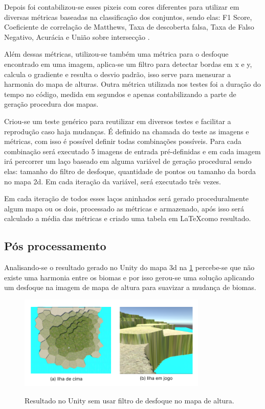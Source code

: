 Depois foi contabilizou-se esses pixeis com cores diferentes para utilizar em diversas métricas baseadas na classificação dos conjuntos, sendo elas: F1 Score, Coeficiente de correlação de Matthews, Taxa de descoberta falsa, Taxa de Falso Negativo, Acurácia e União sobre intersecção \cite{Chicco2020, confusion_matrix_calculator, iou_metric_link}.


Além dessas métricas, utilizou-se também uma métrica para o desfoque encontrado em uma imagem, aplica-se um filtro para detectar bordas em x e y, calcula o gradiente e resulta o desvio padrão, isso serve para mensurar a harmonia do mapa de alturas. Outra métrica utilizada nos testes foi a duração do tempo no código, medida em segundos e apenas contabilizando a parte de geração procedura dos mapas.

Criou-se um teste genérico para reutilizar em diversos testes e facilitar a reprodução caso haja mudanças. É definido na chamada do teste as imagens e métricas, com isso é possível definir todas combinações possíveis. Para cada combinação será executado 5 imagens de entrada pré-definidas e em cada imagem irá percorrer um laço baseado em alguma variável de geração procedural sendo elas: tamanho do filtro de desfoque, quantidade de pontos ou tamanho da borda no mapa 2d. Em cada iteração da variável, será executado três vezes.

Em cada iteração de todos esses laços aninhados será gerado proceduralmente algum mapa ou os dois, processado as métricas e armazenado, após isso será calculado a média das métricas e criado uma tabela em \LaTeX como resultado.

\subsection{Pós processamento}
Analisando-se o resultado gerado no Unity do mapa 3d na \cref{fig:Unity_init} percebe-se que não existe uma harmonia entre os biomas e por isso gerou-se uma solução aplicando um desfoque na imagem de mapa de altura para suavizar a mudança de biomas.

\begin{figure}[!ht]
	\centering
    \caption{Resultado no Unity sem usar filtro de desfoque no mapa de altura.}
	\includegraphics[width=0.8\textwidth]{figures/Unity_entry.png}
	\label{fig:Unity_init}
\end{figure}

